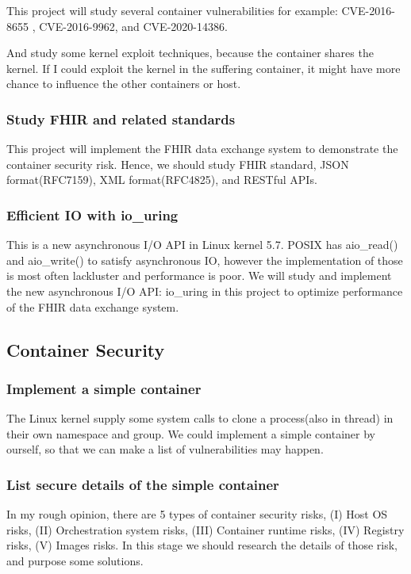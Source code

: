 \documentclass[12pt,a4paper]{IEEEconf}
\begin{document}
This project will study several container vulnerabilities for example: CVE-2016-8655
\cite{CVE-2016-8655}, CVE-2016-9962\cite{CVE-2016-9962}, and CVE-2020-14386\cite{CVE-2020-14386}.

And study some kernel exploit techniques\cite{Kernel_exploitation}, because the container shares
the kernel. If I could exploit the kernel in the suffering container, it might have more chance
to influence the other containers or host.

\subsubsection{Study FHIR and related standards}
This project will implement the FHIR\cite{FHIR_home} data exchange system to demonstrate the container
security risk. Hence, we should study FHIR standard, JSON format(RFC7159), XML format(RFC4825), and
RESTful APIs.

\subsubsection{Efficient IO with io\_uring}\cite{Efficient_IO_uring}
This is a new asynchronous I/O API in Linux kernel 5.7. POSIX has aio\_read() and aio\_write() to
satisfy asynchronous IO, however the implementation of those is most often lackluster and performance
is poor. We will study and implement the new asynchronous I/O API: io\_uring in this project to
optimize performance of the FHIR data exchange system.

\subsection{Container Security}
\subsubsection{Implement a simple container}
The Linux kernel supply some system calls to clone a process(also in thread) in their own namespace
and group. We could implement a simple container by ourself, so that we can make a list of
vulnerabilities may happen.
\UseRawInputEncoding

\subsubsection{List secure details of the simple container}
In my rough opinion, there are 5 types of container security risks, (\RN{1}) Host OS risks, (\RN{2})
Orchestration system risks, (\RN{3}) Container runtime risks, (\RN{4}) Registry risks, (\RN{5})
Images risks. In this stage we should research the details of those risk, and purpose some solutions.
\end{document}
